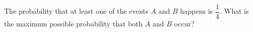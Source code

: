 The probability that at least one of the events $A$ and $B$ happens is $\dfrac{1}{4}$. What is the maximum possible probability that both $A$ and $B$ occur?
